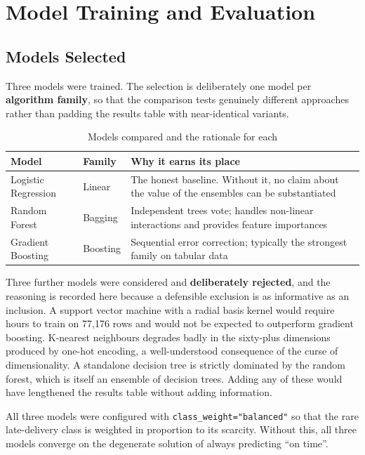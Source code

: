 \documentclass[11pt,a4paper]{report}
\begin{document}
\chapter{Model Training and Evaluation}

\section{Models Selected}

Three models were trained. The selection is deliberately one model per
\textbf{algorithm family}, so that the comparison tests genuinely different
approaches rather than padding the results table with near-identical variants.

\begin{table}[H]
\centering
\caption{Models compared and the rationale for each}
\begin{tabular}{@{}lp{4.1cm}p{5.6cm}@{}}
\toprule
\textbf{Model} & \textbf{Family} & \textbf{Why it earns its place} \\
\midrule
Logistic Regression & Linear & The honest baseline. Without it, no claim about
the value of the ensembles can be substantiated \\
Random Forest & Bagging & Independent trees vote; handles non-linear
interactions and provides feature importances \\
Gradient Boosting & Boosting & Sequential error correction; typically the
strongest family on tabular data \\
\bottomrule
\end{tabular}
\end{table}

Three further models were considered and \textbf{deliberately rejected}, and the
reasoning is recorded here because a defensible exclusion is as informative as
an inclusion. A support vector machine with a radial basis kernel would require
hours to train on 77{,}176 rows and would not be expected to outperform gradient
boosting. K-nearest neighbours degrades badly in the sixty-plus dimensions
produced by one-hot encoding, a well-understood consequence of the curse of
dimensionality. A standalone decision tree is strictly dominated by the random
forest, which is itself an ensemble of decision trees. Adding any of these would
have lengthened the results table without adding information.

All three models were configured with \texttt{class\_weight="balanced"} so that
the rare late-delivery class is weighted in proportion to its scarcity.
Without this, all three models converge on the degenerate solution of always
predicting ``on time''.
\end{document}
